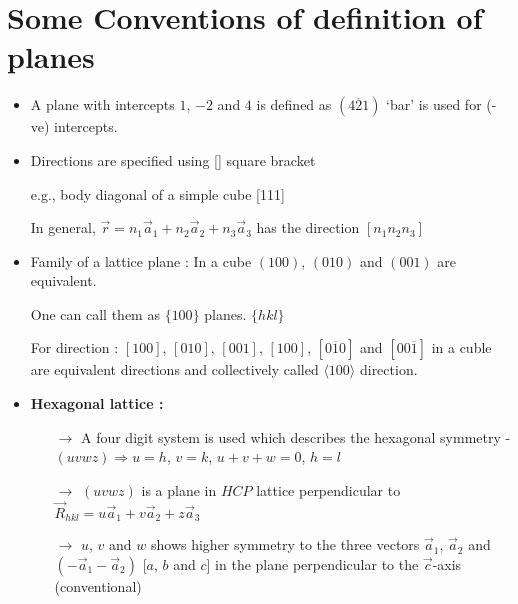 \section*{Some Conventions of definition of planes}
\begin{itemize}
\item A plane with intercepts $1$, $-2$ and $4$ is defined as $(4\overline{2}1)$ `bar' is used for (-ve) intercepts.

\item Directions are specified using [\quad] square bracket 

e.g., body diagonal of a simple cube [111]

In general, $\overrightarrow{r}=n_{1}\overrightarrow{a}_{1}+n_{2}\overrightarrow{a}_{2}+n_{3}\overrightarrow{a}_{3}$ has the direction $[n_{1}n_{2}n_{3}]$

\item Family of a lattice plane : In a cube $(100)$, $(010)$ and $(001)$ are equivalent.

One can call them as $\{100\}$ planes. $\{hkl\}$

For direction : $[100]$, $[010]$, $[001]$, $[100]$, $[0\overline{1}0]$ and $[00\overline{1}]$ in a cuble are equivalent directions and collectively called $\langle 100\rangle$ direction.

\item {\bf Hexagonal lattice : }
\begin{itemize}
\item[$\to$] A four digit system is used which describes the hexagonal symmetry - $(uvwz)\Rightarrow u=h$, $v=k$, $u+v+w=0$, $h=l$

\item[$\to$] $(uvwz)$ is a plane in $HCP$ lattice perpendicular to $\overrightarrow{R}_{hkl}=u\overrightarrow{a}_{1}+v\overrightarrow{a}_{2}+z\overrightarrow{a}_{3}$

\item[$\to$] $u$, $v$ and $w$ shows higher symmetry to the three vectors $\overrightarrow{a}_{1}$, $\overrightarrow{a}_{2}$ and $(-\overrightarrow{a}_{1}-\overrightarrow{a}_{2})$ [$a$, $b$ and $c$] in the plane perpendicular to the $\overrightarrow{c}$-axis (conventional)
\end{itemize}
\end{itemize}

